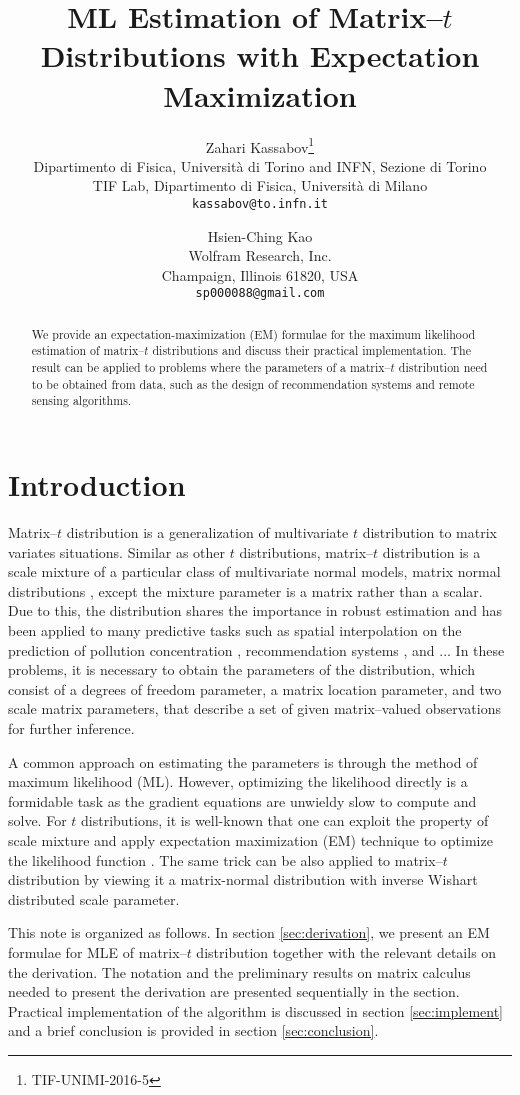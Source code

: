 \documentclass[english,listof=totoc]{scrartcl}
\title{ML Estimation of Matrix--$t$ Distributions with Expectation Maximization}
\author{Zahari Kassabov\thanks{TIF-UNIMI-2016-5}\\
        Dipartimento di Fisica, Universit\`a di Torino and INFN, Sezione di Torino\\
		TIF Lab, Dipartimento di Fisica, Universit\`a di Milano\\
        \texttt{kassabov@to.infn.it}\\
        \and
        Hsien-Ching Kao\\
        Wolfram Research, Inc.\\
		Champaign, Illinois 61820, USA\\
		\texttt{sp000088@gmail.com}
		}
\begin{document}
\maketitle

\begin{abstract}
We provide an expectation-maximization (EM) formulae for the maximum likelihood estimation of matrix--$t$ distributions and discuss their practical implementation. The result can be applied to problems where the parameters of a matrix--$t$ distribution need to be obtained from data, such as the design of recommendation systems and remote sensing algorithms.
\end{abstract}

\section{Introduction}
Matrix--$t$ distribution is a generalization of multivariate $t$ distribution to matrix variates situations. Similar as other $t$ distributions, matrix--$t$ distribution is a scale mixture of a particular class of multivariate normal models, matrix normal distributions \citep{}, except the mixture parameter is a matrix rather than a scalar. Due to this, the distribution shares the importance in robust estimation and has been applied to many predictive tasks such as spatial interpolation on the prediction of pollution concentration \citep{KIBRIA2006785}, recommendation systems \citep{NIPS2007_3203}, and ... In these problems, it is necessary to obtain the parameters of the distribution, which consist of a degrees of freedom parameter, a matrix location parameter, and two scale matrix parameters, that describe a set of given matrix--valued observations for further inference.

A common approach on estimating the parameters is through the method of maximum likelihood (ML). However, optimizing the likelihood directly is a formidable task as the gradient equations are unwieldy slow to compute and solve. For $t$ distributions, it is well-known that one can exploit the property of scale mixture and apply expectation maximization (EM) technique to optimize the likelihood function \citep{}. The same trick can be also applied to matrix--$t$ distribution by viewing it a matrix-normal distribution with inverse Wishart distributed scale parameter.

This note is organized as follows. In section \ref{sec:derivation}, we present an EM formulae for MLE of matrix--$t$ distribution together with the relevant details on the derivation. The notation and the preliminary results on matrix calculus needed to present the derivation are presented sequentially in the section. Practical implementation of the algorithm is discussed in section \ref{sec:implement} and a brief conclusion is provided in section \ref{sec:conclusion}.
\end{document}
